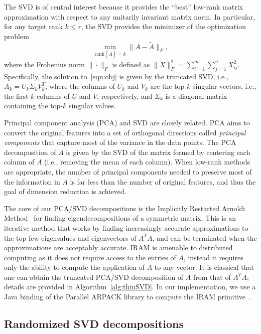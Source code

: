 The SVD is of central interest because it provides the ``best'' low-rank matrix
approximation with respect to any unitarily invariant matrix norm.  In
particular, for any target rank $k \leq r$, the SVD provides the minimizer of
the optimization problem
\begin{equation}
 \label{eqn:obj}
  \min_{\text{rank}(\tilde A) = k} \| A - \tilde A \|_F,
\end{equation}
where the Frobenius norm $\| \cdot \|_F$ is defined as $\|X\|_F^2 =
\sum_{i=1}^m \sum_{j=1}^n X_{ij}^2 $. Specifically, the solution
to~\eqref{eqn:obj} is given by the truncated SVD, i.e., $A_k = U_k \Sigma_k
V_k^T$, where the columns of $U_k$ and $V_k$ are the top $k$ singular vectors,
i.e., the first $k$ columns of $U$ and $V$, respectively, and $\Sigma_k$ is a 
diagonal matrix containing the top-$k$ singular values.

Principal component analysis (PCA) and SVD are closely related.  PCA aims to
convert the original features into a set of orthogonal directions called {\it
principal components} that capture most of the variance in the data points.
The PCA decomposition of $A$ is given by the SVD of the matrix formed by
centering each column of $A$ (i.e., removing the mean of each column).  When
low-rank methods are appropriate, the number of principal components needed to
preserve most of the information in $A$ is far less than the number of original
features, and thus the goal of dimension reduction is achieved.

The core of our PCA/SVD decompositions is the Implicitly Restarted Arnoldi Method~\cite{ArpackUserGuide}
for finding eigendecompositions of a symmetric matrix.  This is an iterative
method that works by finding increasingly accurate approximations to the top
few eigenvalues and eigenvectors of $A^TA$, and can be terminated when the
approximations are acceptably accurate. IRAM is amenable to distributed
computing as it does not require access to the entries of $A$, instead it
requires only the ability to compute the application of $A$ to any vector. It is 
classical that one can obtain the truncated PCA/SVD decomposition of $A$ from that of $A^TA;$
details are provided in Algorithm~\ref{alg:thinSVD}. In our implementation, we use a Java binding of the 
Parallel ARPACK library to compute the IRAM primitive~\cite{maschho1996portable}.

\subsection{Randomized SVD decompositions}

